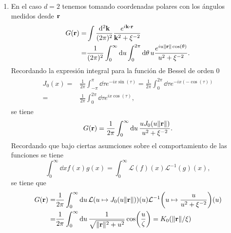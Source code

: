 \documentclass{article}
\begin{document}
\begin{enumerate}
\item En el caso $d=2$ tenemos tomando coordenadas polares con los ángulos medidos desde $\vb{r}$
\begin{align}
\begin{split}
G(\vb{r})=&\int\frac{\dd[2]{\vb{k}}}{(2\pi)^2}\frac{e^{i\vb{k}\vdot\vb{r}}}{\vb{k}^2+\xi^{-2}}\\
=&\frac{1}{(2\pi)^2}\int_0^\infty\dd{u}\int_0^{2\pi}\dd{\theta}u\frac{e^{iu\|\vb{r}\|\cos(\theta)}}{u^2+\xi^{-2}}.
\end{split}
\end{align}
Recordando la expresión integral para la función de Bessel de orden $0$
\begin{align}
\begin{split}
J_0(x)=&\frac{1}{2\pi}\int_{-\pi}^\pi\dd{\tau} e^{-ix\sin(\tau)}=\frac{1}{2\pi}\int_0^{2\pi}\dd{\tau} e^{-ix(-\cos(\tau))}\\
=&\frac{1}{2\pi}\int_0^{2\pi}\dd{\tau} e^{ix\cos(\tau)},
\end{split}
\end{align}
se tiene
\begin{equation}
G(\vb{r})=\frac{1}{2\pi}\int_0^\infty\dd{u}\frac{uJ_0(u\|\vb{r}\|)}{u^2+\xi^{-2}}.
\end{equation}
Recordando que bajo ciertas asumciones sobre el comportamiento de las funciones se tiene
\begin{equation}
\int_0^\infty \dd{x}f(x)g(x)=\int_0^\infty \mathcal{L}(f)(x)\mathcal{L}^{-1}(g)(x),
\end{equation}
se tiene que
\begin{align}
\begin{split}
G(\vb{r})=&\frac{1}{2\pi}\int_0^\infty\dd{u}\mathcal{L}(u\mapsto J_0(u\|\vb{r}\|))(u)\mathcal{L}^{-1}\qty(u\mapsto\frac{u}{u^2+\xi^{-2}})(u)\\
=&\frac{1}{2\pi}\int_0^\infty\dd{u}\frac{1}{\sqrt{\|\vb{r}\|^2+u^2}}\cos(\frac{u}{\zeta})=K_0(\|\vb{r}\|/\xi)
\end{split}
\end{align}

\end{enumerate}
\end{document}
